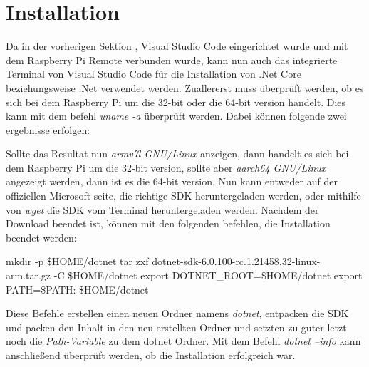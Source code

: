\section{Installation}
\label{sec:installation}
Da in der vorherigen Sektion \emph{}, Visual Studio Code eingerichtet wurde und mit dem Raspberry Pi
Remote verbunden wurde, kann nun auch das integrierte Terminal von Visual Studio Code für die
Installation von .Net Core beziehungsweise .Net verwendet werden.
\newline
\newline
Zuallererst muss überprüft werden, ob es sich bei dem Raspberry Pi um die 32-bit oder die 64-bit
version handelt. Dies kann mit dem befehl \emph{uname -a} überprüft werden. Dabei können folgende
zwei ergebnisse erfolgen:
Sollte das Resultat nun \emph{armv7l GNU/Linux} anzeigen, dann handelt es sich bei dem Raspberry
Pi um die 32-bit version, sollte aber \emph{aarch64 GNU/Linux} angezeigt werden, dann ist es die
64-bit version.
\newline
\newline
Nun kann entweder auf der offiziellen Microsoft seite, die richtige SDK heruntergeladen werden,
oder mithilfe von \emph{wget} die SDK vom Terminal heruntergeladen werden. Nachdem der Download
beendet ist, können mit den folgenden befehlen, die Installation beendet werden:
\begin{zitat}
    mkdir -p \$HOME/dotnet
    \newline
    tar zxf dotnet-sdk-6.0.100-rc.1.21458.32-linux-arm.tar.gz -C \$HOME/dotnet
    \newline
    export DOTNET\_ROOT=\$HOME/dotnet
    \newline
    export PATH=\$PATH: \$HOME/dotnet
\end{zitat}

Diese Befehle erstellen einen neuen Ordner namens \emph{dotnet}, entpacken die SDK und packen den
Inhalt in den neu erstellten Ordner und setzten zu guter letzt noch die \emph{Path-Variable} zu
dem dotnet Ordner.
\newline
\newline
Mit dem Befehl \emph{dotnet --info} kann anschließend überprüft werden, ob die Installation
erfolgreich war.